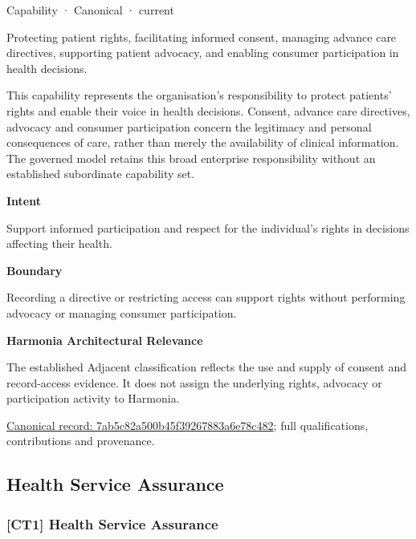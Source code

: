 \label{element:7ab5c82a500b45f39267883a6e78c482}
{\small Capability · Canonical · current}\par

Protecting patient rights, facilitating informed consent, managing advance care directives, supporting patient advocacy, and enabling consumer participation in health decisions.



This capability represents the organisation's responsibility to protect patients' rights and enable their voice in health decisions. Consent, advance care directives, advocacy and consumer participation concern the legitimacy and personal consequences of care, rather than merely the availability of clinical information. The governed model retains this broad enterprise responsibility without an established subordinate capability set.



\textbf{Intent}



Support informed participation and respect for the individual's rights in decisions affecting their health.



\textbf{Boundary}



Recording a directive or restricting access can support rights without performing advocacy or managing consumer participation.



\textbf{Harmonia Architectural Relevance}



The established Adjacent classification reflects the use and supply of consent and record-access evidence. It does not assign the underlying rights, advocacy or participation activity to Harmonia.


{\footnotesize \href{../../../../continuum/strategy/capability/7ab5c82a500b45f39267883a6e78c482.md}{Canonical record: 7ab5c82a500b45f39267883a6e78c482}; full qualifications, contributions and provenance.}\par
\subsection{Health Service Assurance}

\subsubsection{[CT1] Health Service Assurance}


